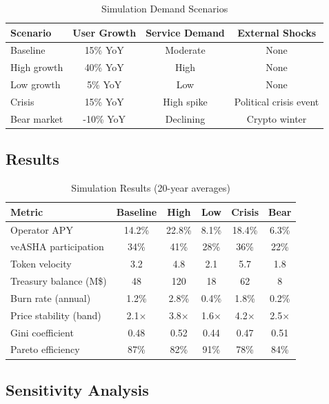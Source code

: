 \documentclass[11pt,a4paper]{article}
\begin{document}
\begin{table}[H]
\centering
\caption{Simulation Demand Scenarios}
\label{tab:scenarios}
\begin{tabular}{lccc}
\toprule
\textbf{Scenario} & \textbf{User Growth} & \textbf{Service Demand} & \textbf{External Shocks} \\
\midrule
Baseline & 15\% YoY & Moderate & None \\
High growth & 40\% YoY & High & None \\
Low growth & 5\% YoY & Low & None \\
Crisis & 15\% YoY & High spike & Political crisis event \\
Bear market & -10\% YoY & Declining & Crypto winter \\
\bottomrule
\end{tabular}
\end{table}

\subsection{Results}

\begin{table}[H]
\centering
\caption{Simulation Results (20-year averages)}
\label{tab:sim-results}
\begin{tabular}{lccccc}
\toprule
\textbf{Metric} & \textbf{Baseline} & \textbf{High} & \textbf{Low} & \textbf{Crisis} & \textbf{Bear} \\
\midrule
Operator APY & 14.2\% & 22.8\% & 8.1\% & 18.4\% & 6.3\% \\
veASHA participation & 34\% & 41\% & 28\% & 36\% & 22\% \\
Token velocity & 3.2 & 4.8 & 2.1 & 5.7 & 1.8 \\
Treasury balance (M\$) & 48 & 120 & 18 & 62 & 8 \\
Burn rate (annual) & 1.2\% & 2.8\% & 0.4\% & 1.8\% & 0.2\% \\
Price stability (band) & 2.1$\times$ & 3.8$\times$ & 1.6$\times$ & 4.2$\times$ & 2.5$\times$ \\
Gini coefficient & 0.48 & 0.52 & 0.44 & 0.47 & 0.51 \\
Pareto efficiency & 87\% & 82\% & 91\% & 78\% & 84\% \\
\bottomrule
\end{tabular}
\end{table}

\subsection{Sensitivity Analysis}
\end{document}
